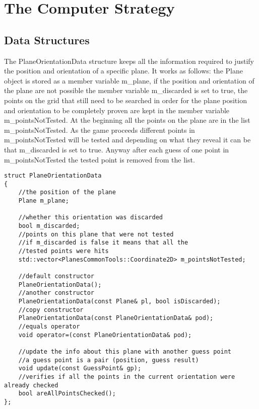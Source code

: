 \section{The Computer Strategy}

\subsection{Data Structures}

The PlaneOrientationData structure keeps all the information required to justify the position and orientation of a specific plane. It works as follows: the Plane object is stored as a member variable m\_plane, if the position and orientation of the plane are not possible the member variable m\_discarded is set to true, the points on the grid that still need to be searched in order for the plane position and orientation to be completely proven are kept in the member variable m\_pointsNotTested. At the beginning all the points on the plane are in the list m\_pointsNotTested. As the game proceeds different points in m\_pointsNotTested will be tested and depending on what they reveal it can be that m\_discarded is set to true. Anyway after each guess of one point in m\_pointsNotTested the tested point is removed from the list. 

\begin{lstlisting}
struct PlaneOrientationData
{
	//the position of the plane
	Plane m_plane;
	
	//whether this orientation was discarded
	bool m_discarded;
	//points on this plane that were not tested
	//if m_discarded is false it means that all the
	//tested points were hits
	std::vector<PlanesCommonTools::Coordinate2D> m_pointsNotTested;
	
	//default constructor
	PlaneOrientationData();
	//another constructor
	PlaneOrientationData(const Plane& pl, bool isDiscarded);
	//copy constructor
	PlaneOrientationData(const PlaneOrientationData& pod);
	//equals operator
	void operator=(const PlaneOrientationData& pod);
	
	//update the info about this plane with another guess point
	//a guess point is a pair (position, guess result)
	void update(const GuessPoint& gp);
	//verifies if all the points in the current orientation were already checked
	bool areAllPointsChecked();
};

\end{lstlisting}


